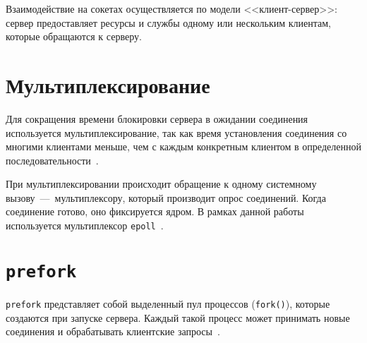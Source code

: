 Взаимодействие на сокетах осуществляется по модели <<клиент-сервер>>: сервер предоставляет ресурсы и службы одному или нескольким клиентам, которые обращаются к серверу. 

\section{Мультиплексирование}
Для сокращения времени блокировки сервера в ожидании соединения используется мультиплексирование, так как время установления соединения со многими клиентами меньше, чем с каждым конкретным клиентом в определенной последовательности~\cite{ryaznu}. 

При мультиплексировании происходит обращение к одному системному вызову~---~мультиплексору, который производит опрос соединений. Когда соединение готово, оно фиксируется ядром. В рамках данной работы используется мультиплексор \texttt{epoll}~\cite{manual}.

\section{\texttt{prefork}}

\texttt{prefork} представляет собой выделенный пул процессов (\texttt{fork()}), которые создаются при запуске сервера. Каждый такой процесс может принимать новые соединения и обрабатывать клиентские запросы~\cite{prefork}.